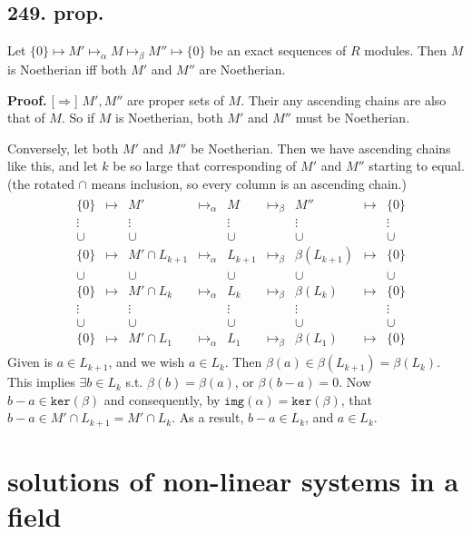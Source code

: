 \documentclass[12pt]{article}
\newcommand\aG\alpha \newcommand\bG\beta  \newcommand\gG\gamma \newcommand\dG\delta \newcommand\eG\varepsilon \newcommand\zG\zeta \newcommand\tG\vartheta \newcommand\kG\kappa \newcommand\lG\lambda \newcommand\sG\sigma \newcommand\fG\varphi \newcommand\oG\omega
\newcommand{\Ex}\exists%
\newcommand{\Mp}\mapsto%
\newcommand{\Ip}{\Rightarrow} %
\newcommand{\Ss}[1]{\textsf{\bfseries{#1}}}%
\newcommand{\Tw}[1]{\texttt{#1}}%
\begin{document}
\subsection*{249. prop.} Let \(\{0\} \Mp M' \Mp_\aG M \Mp_\bG M'' \Mp \{0\}\) be an exact sequences of \(R\) modules. 
Then \(M\) is Noetherian iff both \(M'\) and \(M''\) are Noetherian. \par
\Ss{Proof.} [\(\Ip\)] \(M',M''\) are proper sets of \(M\). 
Their any ascending chains are also that of \(M\). 
So if \(M\) is Noetherian, both \(M'\) and \(M''\) must be Noetherian. \par
[\(\Rightarrow\)] Conversely, let both \(M'\) and \(M''\) be Noetherian. 
Then we have ascending chains like this, and let \(k\) be so large that corresponding of \(M'\) and \(M''\) starting to equal. (the rotated \(\cap\) means inclusion, so every column is an ascending chain.) \begin{gather*}
 \begin{matrix}
 &\{0\} &\Mp &M' &\Mp_\aG &M &\Mp_\bG &M'' &\Mp &\{0\} \\
 &\vdots & &\vdots & &\vdots & &\vdots & &\vdots \\
 &\cup & &\cup & &\cup & &\cup & &\cup \\
 &\{0\} &\Mp &M' \cap L_{k+1} &\Mp_\aG &L_{k+1} &\Mp_\bG &\bG(L_{k+1}) &\Mp &\{0\} \\
 &\cup & &\cup & &\cup & &\cup & &\cup \\
 &\{0\} &\Mp &M' \cap L_k &\Mp_\aG &L_k &\Mp_\bG &\bG(L_k) &\Mp &\{0\} \\
 &\vdots & &\vdots & &\vdots & &\vdots & &\vdots \\
 &\cup & &\cup & &\cup & &\cup & &\cup \\
 &\{0\} &\Mp &M' \cap L_1 &\Mp_\aG &L_1 &\Mp_\bG &\bG(L_1) &\Mp &\{0\}
 \end{matrix}
\end{gather*} Given is \(a \in L_{k+1}\), and we wish \(a \in L_k\). 
Then \(\bG(a) \in \bG(L_{k+1}) =\bG(L_k)\). 
This implies \(\Ex b \in L_k\) s.t. \(\bG(b) =\bG(a)\), or \(\bG(b-a) =0\). 
Now \(b-a \in \Tw{ker}(\bG)\) and consequently, by \(\Tw{img}(\aG) =\Tw{ker}(\bG)\), that \(b-a \in M' \cap L_{k+1} =M' \cap L_k\). 
As a result, \(b-a \in L_k\), and \(a \in L_k\). 

\section{solutions of non-linear systems in a field}
\end{document}
